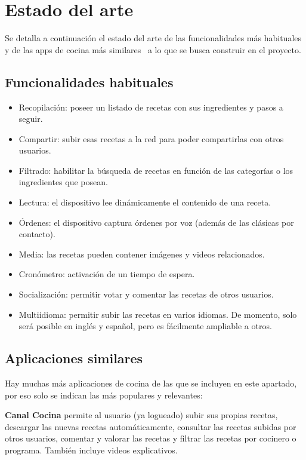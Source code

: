 \section{Estado del arte}
\label{sec:estado-del-arte}

Se detalla a continuación el estado del arte de las funcionalidades más
habituales y de las apps de cocina más similares~\cite{mejores-apps-cocina}
a lo que se busca construir en el proyecto.

\subsection{Funcionalidades habituales}

\begin{itemize}
\item Recopilación: poseer un listado de recetas con sus ingredientes
  y pasos a seguir.
\item Compartir: subir esas recetas a la red para poder compartirlas con
  otros usuarios.
\item Filtrado: habilitar la búsqueda de recetas en función de
  las categorías o los ingredientes que posean.
\item Lectura: el dispositivo lee dinámicamente el contenido de una
  receta.
\item Órdenes: el dispositivo captura órdenes por voz (además de
  las clásicas por contacto).
\item Media: las recetas pueden contener imágenes y videos
  relacionados.
\item Cronómetro: activación de un tiempo de espera.
\item Socialización: permitir votar y comentar las recetas de otros usuarios.
\item Multiidioma: permitir subir las recetas en varios idiomas. De momento,
  solo será posible en inglés y español, pero es fácilmente ampliable a otros.
\end{itemize}

\subsection{Aplicaciones similares}

Hay muchas más aplicaciones de cocina de las que se incluyen en este apartado,
por eso solo se indican las más populares y relevantes:

\textbf{Canal Cocina} permite al usuario (ya logueado) subir sus propias
recetas, descargar las nuevas recetas automáticamente, consultar las recetas
subidas por otros usuarios, comentar y valorar las recetas y filtrar las
recetas por cocinero o programa. También incluye videos explicativos.

